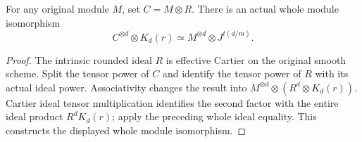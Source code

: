 \begin{lemma}
\label{lem:kn-nadel-original-rounded-cleared-line}
\leanok
{}
For any original module $M$, set $C=M\otimes R$. There is an actual
whole module isomorphism
\[
 C^{\otimes d}\otimes K_d(r)\simeq
 M^{\otimes d}\otimes J^{t(d/m)}.
\]
\end{lemma}
\begin{proof}
The intrinsic rounded ideal $R$ is effective Cartier on the original
smooth scheme. Split the tensor power of $C$ and identify the tensor
power of $R$ with its actual ideal power. Associativity changes the
result into $M^{\otimes d}\otimes(R^d\otimes K_d(r))$.
Cartier ideal tensor multiplication identifies the second factor with
the entire ideal product $R^dK_d(r)$; apply the preceding whole ideal
equality. This constructs the displayed whole module isomorphism.
\end{proof}
